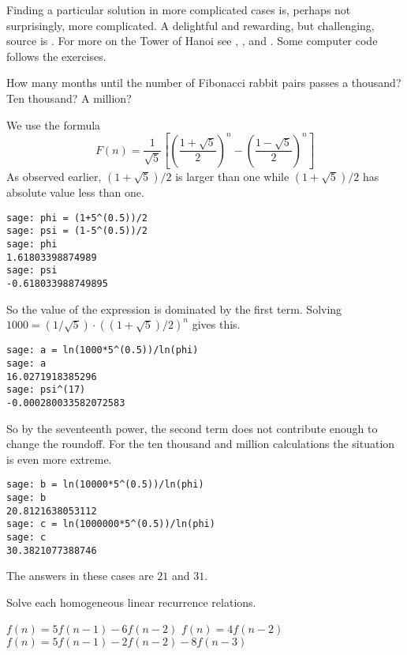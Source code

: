 Finding a particular solution in more complicated cases is, 
perhaps not surprisingly,
more complicated.
A delightful and rewarding, but challenging, source 
is \cite{GrahamKnuthPatashnik}.
For more on the Tower of Hanoi see \cite{Ball}, \cite{Gardner57}, 
and \cite{Hofstadter}.
Some computer code follows the 
exercises.

\begin{exercises}
  \item 
   How many months until the number of Fibonacci rabbit pairs
   passes a thousand?
   Ten thousand?
   A million?
   \begin{answer}
     We use the formula
     \begin{equation*}
       F(n)=\frac{1}{\sqrt{5}}\left[\left(\frac{1+\sqrt{5}}{2}\right)^{n}
                               -\left(\frac{1-\sqrt{5}}{2}\right)^{n}\right]
     \end{equation*}
     As observed earlier, $(1+\sqrt{5})/2$ is larger than one 
     while $(1+\sqrt{5})/2$ has absolute value less than one.
\begin{lstlisting}
sage: phi = (1+5^(0.5))/2
sage: psi = (1-5^(0.5))/2
sage: phi
1.61803398874989
sage: psi
-0.618033988749895       
\end{lstlisting}
     So the value of the expression is dominated by the first term.
     Solving $1000=(1/\sqrt{5})\cdot ((1+\sqrt{5})/2)^n$ gives
     this.
\begin{lstlisting}
sage: a = ln(1000*5^(0.5))/ln(phi)
sage: a
16.0271918385296
sage: psi^(17)
-0.000280033582072583       
\end{lstlisting}
   So by the seventeenth power, the second term does not contribute 
   enough to change the roundoff.
   For the ten thousand and million calculations the situation is even
   more extreme.
\begin{lstlisting}
sage: b = ln(10000*5^(0.5))/ln(phi)
sage: b
20.8121638053112
sage: c = ln(1000000*5^(0.5))/ln(phi)
sage: c
30.3821077388746    
\end{lstlisting}
   The answers in these cases are $21$ and $31$.
   \end{answer}
  \item 
   Solve each homogeneous linear recurrence relations.
   \begin{exparts}
     \partsitem $f(n)=5f(n-1)-6f(n-2)$   
     \partsitem $f(n)=4f(n-2)$   
     \partsitem $f(n)=5f(n-1)-2f(n-2)-8f(n-3)$   
   \end{exparts}
   \begin{answer}

\end{answer}
\end{exercises}
